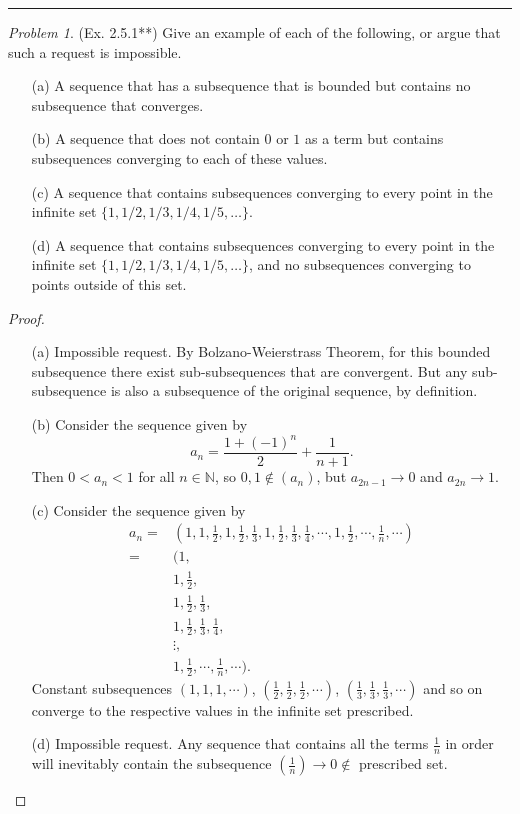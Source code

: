 \documentclass[11pt,twoside, reqno]{amsart}
\theoremstyle{remark}
\newtheorem{Prob}{Problem}
\def\N{\mathbb N}
\begin{document}
\hrule
{}

\begin{Prob}(Ex. 2.5.1**) Give an example of each of the following, or argue that such a request is impossible.
\begin{enumerate}
    \item [(a)] A sequence that has a subsequence that is bounded but contains no subsequence that converges.
    \item [(b)] A sequence that does not contain $0$ or $1$ as a term but contains subsequences converging to each of these values.
    \item [(c)] \sloppy A sequence that contains subsequences converging to every point in the infinite set $\{1,1/2,1/3,1/4,1/5,\ldots\}$.
    \item [(d)] A sequence that contains subsequences converging to every point in the infinite set $\{1,1/2,1/3,1/4,1/5,\ldots\}$, and no subsequences converging to points outside of this set.
\end{enumerate}
\end{Prob}
\fussy
\begin{proof}
\begin{enumerate}
    \item [(a)] Impossible request. By Bolzano-Weierstrass Theorem, for this bounded subsequence there exist sub-subsequences that are convergent. But any sub-subsequence is also a subsequence of the original sequence, by definition.
    \item [(b)] Consider the sequence given by
    $$
        a_n = \frac{1+(-1)^n}{2} + \frac{1}{n+1}.
    $$
    Then $0 < a_n < 1$ for all $n \in \N$, so $0,1 \not \in (a_n)$, but $a_{2n-1} \to 0$ and $a_{2n} \to 1$.
    \item [(c)] Consider the sequence given by
    \begin{align*}
        a_n = &(1, 1, \frac{1}{2}, 1, \frac{1}{2}, \frac{1}{3}, 1, \frac{1}{2}, \frac{1}{3}, \frac{1}{4}, \cdots, 1, \frac{1}{2}, \cdots, \frac{1}{n}, \cdots) \\
        = &(1, \\
        &1, \frac{1}{2}, \\
        &1, \frac{1}{2}, \frac{1}{3}, \\
        &1, \frac{1}{2}, \frac{1}{3}, \frac{1}{4}, \\
        &\vdots, \\
        &1, \frac{1}{2}, \cdots, \frac{1}{n}, \cdots).
    \end{align*}
    Constant subsequences $(1,1,1,\cdots)$, $(\frac{1}{2},\frac{1}{2},\frac{1}{2}, \cdots)$, $(\frac{1}{3},\frac{1}{3},\frac{1}{3}, \cdots)$ and so on converge to the respective values in the infinite set prescribed.
    \item [(d)] Impossible request. Any sequence that contains all the terms $\frac{1}{n}$ in order will inevitably contain the subsequence $(\frac{1}{n}) \to 0 \not \in$ prescribed set.
\end{enumerate}

\end{proof}
\end{document}
